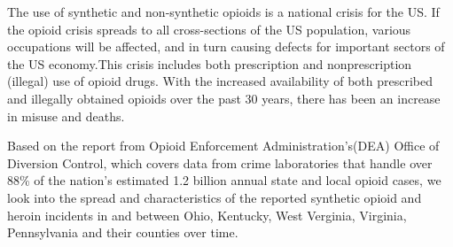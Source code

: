 The use of synthetic and non-synthetic opioids is a national crisis for the US. If the opioid crisis spreads to all cross-sections of the US population, various occupations will be affected, and in turn causing defects for important sectors of the US economy.This crisis includes both prescription and nonprescription (illegal) use of opioid drugs.\cite{1} With the increased availability of both prescribed and illegally obtained opioids over the past 30 years, there has been an increase in misuse and deaths.\cite{2}

Based on the report from Opioid Enforcement Administration's(DEA) Office of Diversion Control, which covers data from crime laboratories that handle over 88\% of the nation's estimated 1.2 billion annual state and local opioid cases, we look into the spread and characteristics of the reported synthetic opioid and heroin incidents in and between Ohio, Kentucky, West Verginia, Virginia, Pennsylvania and their counties over time.


